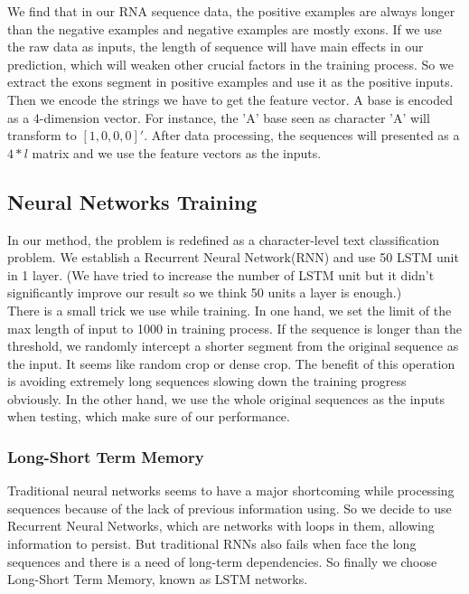 \documentclass[paper=a4, fontsize=11pt] {scrartcl} %
\numberwithin{equation}{section} %
\numberwithin{figure}{section} %
\numberwithin{table}{section} %
\begin{document}
We find that in our RNA sequence data, the positive examples are always longer than the negative examples and negative examples are mostly exons. If we use the raw data as inputs, the length of sequence will have main effects in our prediction, which will weaken other crucial factors in the training process. So we extract the exons segment in positive examples and use it as the positive inputs. \\

Then we encode the strings we have to get the feature vector. A base is encoded as a 4-dimension vector. For instance, the 'A' base seen as character 'A' will transform to $[1,0,0,0]'$. After data processing, the sequences will presented as a $4*l$ matrix and we use the feature vectors as the inputs.\\

\subsection{Neural Networks Training}

In our method, the problem is redefined as a character-level text classification problem. We establish a Recurrent Neural Network(RNN) and use 50 LSTM unit in 1 layer. (We have tried to increase the number of LSTM unit but it didn't significantly improve our result so we think 50 units a layer is enough.) \\

There is a small trick we use while training. In one hand, we set the limit of the max length of input to 1000 in training process. If the sequence is longer than the threshold, we randomly intercept a shorter segment from the original sequence as the input. It seems like random crop or dense crop. The benefit of this operation is avoiding extremely long sequences slowing down the training progress obviously. In the other hand, we use the whole original sequences as the inputs when testing, which 
make sure of our performance.

\subsubsection{Long-Short Term Memory}

Traditional neural networks seems to have a major shortcoming while processing sequences because of the lack of previous information using. So we decide to use Recurrent Neural Networks, which are networks with loops in them, allowing information to persist. But traditional RNNs also fails when face the long sequences and there is a need of long-term dependencies. So finally we choose 
Long-Short Term Memory, known as LSTM networks.\\
\end{document}
